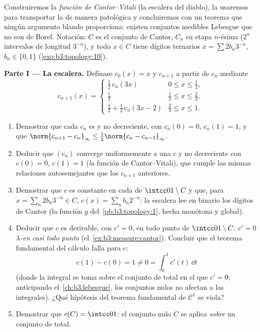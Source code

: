 \begin{problem}
\label{pb:b3:measure:1}
Construiremos la \emph{función de Cantor--Vitali} (la escalera del
diablo), la usaremos para transportar la
 de manera patológica y
concluiremos con un teorema que ningún argumento blando proporciona:
existen conjuntos medibles Lebesgue que no son de Borel. Notación: $C$
es el conjunto de Cantor, $C_n$ su etapa $n$-ésima ($2^n$ intervalos de
longitud $3^{-n}$), y todo $x \in C$ tiene dígitos ternarios
$x = \sum 2b_n3^{-n}$, $b_n \in \{0,1\}$
(\cref{exo:b3:topology:10}).

\medskip
\noindent\textbf{Parte I --- La escalera.} Defínase $c_0(x) = x$ y
$c_{n+1}$ a partir de $c_n$ mediante
\[
c_{n+1}(x) = \begin{cases}
\tfrac12\,c_n(3x) & 0 \leq x \leq \tfrac13,\\[2pt]
\tfrac12 & \tfrac13 \leq x \leq \tfrac23,\\[2pt]
\tfrac12 + \tfrac12\,c_n(3x - 2) & \tfrac23 \leq x \leq 1.
\end{cases}
\]
\begin{enumerate}
  \item Demostrar que cada $c_n$ es
   y no decreciente, con
  $c_n(0) = 0$, $c_n(1) = 1$, y que
        $\norm{c_{n+1} - c_n}_\infty \leq
        \tfrac12\norm{c_n - c_{n-1}}_\infty$.
  \item Deducir que $(c_n)$ converge uniformemente a una $c$
   y no decreciente con
  $c(0) = 0$, $c(1) = 1$ (\emph{la} función de Cantor--Vitali), que
  cumple las mismas relaciones autosemejantes que los $c_{n+1}$
  anteriores. \item Demostrar que $c$ es constante en cada
   de
  $\intcc01\setminus C$ y que, para $x = \sum_n
        2b_n3^{-n} \in C$, $c(x) = \sum_n b_n2^{-n}$: la escalera lee en
  binario los dígitos de Cantor (la función $g$
  del~\cref{pb:b3:topology:1}, hecha monótona y global). \item Deducir
  que $c$ es derivable, con $c' = 0$, en todo punto de
  $\intcc01\setminus C$: $c' = 0$ \emph{$\lambda$-en casi todo punto}
  (el~\cref{ex:b3:measure:cantor}). Concluir que el teorema fundamental
  del cálculo falla para $c$:
        \[
        c(1) - c(0) = 1 \neq 0 = \int_0^1 c'(t)\,\dd t
        \]
        (donde la integral se toma sobre el conjunto de
         total en el que
        $c' = 0$; anticipando el~\cref{ch:b3:lebesgue}, los conjuntos
        nulos no afectan a las integrales). ¿Qué hipótesis del teorema
        fundamental de $\mathcal C^1$ se viola? \item Demostrar que
        $c(C) = \intcc01$: el conjunto nulo $C$ se aplica \emph{sobre}
        un conjunto de  total.
\end{enumerate}


\end{problem}
